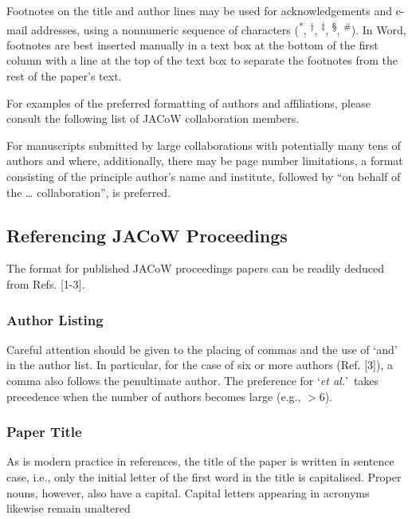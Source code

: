 \documentclass[a4paper,
              ]{jacow}
\begin{document}
Footnotes on the title and author lines may be used for
acknowledgements and e-mail addresses, using a nonnumeric
sequence of characters (\textsuperscript{*}, \textsuperscript{†}, 
\textsuperscript{‡}, \textsuperscript{§}, \textsuperscript{\#}). In Word,
footnotes are best inserted manually in a text box at the
bottom of the first column with a line at the top of the text
box to separate the footnotes from the rest of the paper’s
text.

For examples of the preferred formatting of authors and
affiliations, please consult the following list of JACoW
collaboration members.

For manuscripts submitted by large collaborations with
potentially many tens of authors and where, additionally,
there may be page number limitations, a format consisting
of the principle author’s name and institute, followed by
“on behalf of the … collaboration”, is preferred.


\clearpage
%
%
{}

\clearpage



\subsection{Referencing JACoW Proceedings}

The format for published JACoW proceedings papers
can be readily deduced from Refs. [1-3].

\subsubsection{Author Listing} Careful attention should be given to the
placing of commas and the use of ‘and’ in the author list.
In particular, for the case of six or more authors
(Ref. [3]), a comma also follows the penultimate author.
The preference for ‘\emph{et al.}’\ takes precedence when the number
of authors becomes large (e.g., $>$6).

\subsubsection{Paper Title} As is modern practice in references, the title
of the paper is written in sentence case, i.e., only the
initial letter of the first word in the title is capitalised.
Proper nouns, however, also have a capital. Capital letters
appearing in acronyms likewise remain unaltered
\end{document}
